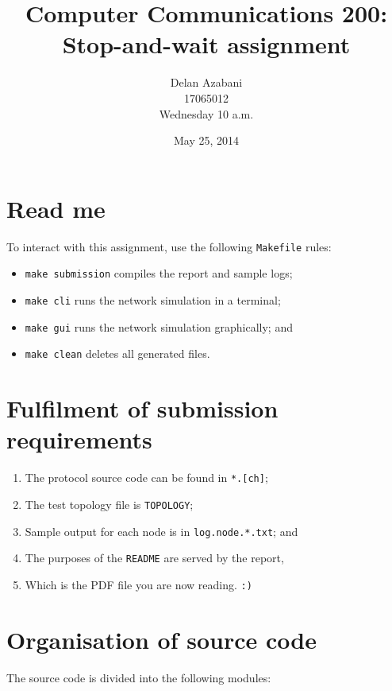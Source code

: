 \documentclass[a4paper,12pt,titlepage]{article}
\title{Computer Communications 200:\\
       Stop-and-wait assignment}
\date{May 25, 2014}
\author{Delan Azabani\\17065012\\Wednesday 10 a.m.}
\begin{document}

\maketitle


\section{Read me}

To interact with this assignment, use the following \texttt{Makefile} rules:

\begin{itemize}
	\item \texttt{make submission} compiles the report and sample logs;
	\item \texttt{make cli} runs the network simulation in a terminal;
	\item \texttt{make gui} runs the network simulation graphically; and
	\item \texttt{make clean} deletes all generated files.
\end{itemize}

\section{Fulfilment of submission requirements}

\begin{enumerate}
	\item The protocol source code can be found in \texttt{*.[ch]};
	\item The test topology file is \texttt{TOPOLOGY};
	\item Sample output for each node is in \texttt{log.node.*.txt}; and
	\item The purposes of the \texttt{README} are served by the report,
	\item Which is the PDF file you are now reading. \texttt{:)}
\end{enumerate}

\section{Organisation of source code}

The source code is divided into the following modules:
\end{document}
